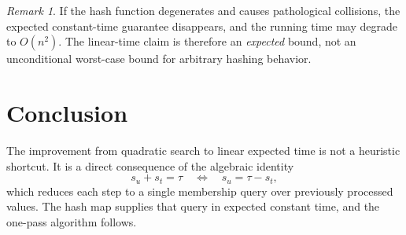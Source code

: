 \documentclass[11pt]{article}
\theoremstyle{remark}
\newtheorem{remark}{Remark}
\begin{document}
\begin{remark}
If the hash function degenerates and causes pathological collisions, the expected constant-time guarantee disappears, and the running time may degrade to \(O(n^2)\). The linear-time claim is therefore an \emph{expected} bound, not an unconditional worst-case bound for arbitrary hashing behavior.
\end{remark}

\section{Conclusion}

The improvement from quadratic search to linear expected time is not a heuristic shortcut. It is a direct consequence of the algebraic identity
\[
s_u + s_t = \tau
\quad \Longleftrightarrow \quad
s_u = \tau - s_t,
\]
which reduces each step to a single membership query over previously processed values. The hash map supplies that query in expected constant time, and the one-pass algorithm follows.
\end{document}
